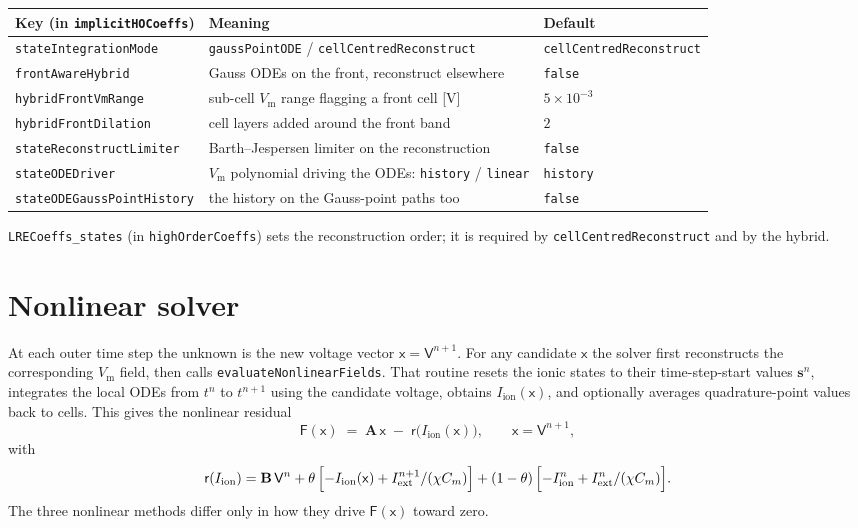 \documentclass[11pt,a4paper]{article}
\newcommand{\code}[1]{\texttt{\small #1}}
\newcommand{\Vm}{V_{\text{m}}}
\newcommand{\Iion}{I_{\mathrm{ion}}}
\newcommand{\Aimp}{\mathbf{A}}
\newcommand{\Bimp}{\mathbf{B}}
\newcommand{\Fres}{\mathsf{F}}
\newcommand{\Iext}{I_{\mathrm{ext}}}
\begin{document}
\begin{center}
\begin{tabular}{@{}lll@{}}
\toprule
Key (in \code{implicitHOCoeffs}) & Meaning & Default \\
\midrule
\code{stateIntegrationMode} & \code{gaussPointODE} / \code{cellCentredReconstruct} & \code{cellCentredReconstruct} \\
\code{frontAwareHybrid} & Gauss ODEs on the front, reconstruct elsewhere & \code{false} \\
\code{hybridFrontVmRange} & sub-cell $\Vm$ range flagging a front cell [V] & $5\times10^{-3}$ \\
\code{hybridFrontDilation} & cell layers added around the front band & $2$ \\
\code{stateReconstructLimiter} & Barth--Jespersen limiter on the reconstruction & \code{false} \\
\code{stateODEDriver} & $\Vm$ polynomial driving the ODEs: \code{history} / \code{linear} & \code{history} \\
\code{stateODEGaussPointHistory} & the history on the Gauss-point paths too & \code{false} \\
\bottomrule
\end{tabular}
\end{center}
\code{LRECoeffs\_states} (in \code{highOrderCoeffs}) sets the reconstruction
order; it is required by \code{cellCentredReconstruct} and by the hybrid.

\section{Nonlinear solver}

At each outer time step the unknown is the new voltage vector
$\mathsf{x}=\mathsf{V}^{n+1}$. For any candidate $\mathsf{x}$ the solver
first reconstructs the corresponding $\Vm$ field, then calls
\code{evaluateNonlinearFields}. That routine resets the ionic states to
their time-step-start values $\mathbf{s}^{n}$, integrates the local ODEs
from $t^n$ to $t^{n+1}$ using the candidate voltage, obtains
$\Iion(\mathsf{x})$, and optionally averages quadrature-point values
back to cells. This gives the nonlinear residual
\begin{equation}
  \Fres(\mathsf{x})
   \;=\;
   \Aimp\, \mathsf{x}
   \;-\;
   \mathsf{r}\!\bigl( \Iion(\mathsf{x}) \bigr),
   \qquad
   \mathsf{x} = \mathsf{V}^{n+1},
   \label{eq:Fdef}
\end{equation}
with
\begin{equation}
  \mathsf{r}(\Iion)
  =
  \Bimp\,\mathsf{V}^{n}
  + \theta\,\Bigl[-\Iion(\mathsf{x})+\Iext^{n+1}/(\chi C_m)\Bigr]
  + (1-\theta)\,\Bigl[-\Iion^{n}+\Iext^{n}/(\chi C_m)\Bigr].
  \label{eq:rhsIion}
\end{equation}
The three nonlinear methods differ only in how they drive
$\Fres(\mathsf{x})$ toward zero.
\end{document}
